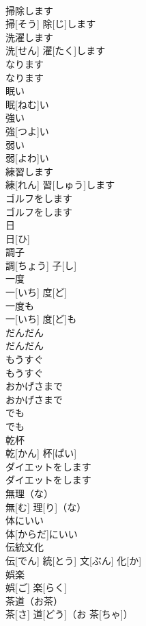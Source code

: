\documentclass[8pt]{extreport}
\begin{document}
\begin{CJK}{UTF8}{min}
\\	掃除します	
\\	掃[そう] 除[じ]します		
\\	洗濯します	
\\	洗[せん] 濯[たく]します		
\\	なります	
\\	なります		
\\	眠い	
\\	眠[ねむ]い		
\\	強い	
\\	強[つよ]い		
\\	弱い	
\\	弱[よわ]い		
\\	練習します	
\\	練[れん] 習[しゅう]します		
\\	ゴルフをします	
\\	ゴルフをします		
\\	日	
\\	日[ひ]		
\\	調子	
\\	調[ちょう] 子[し]		
\\	一度	
\\	一[いち] 度[ど]		
\\	一度も	
\\	一[いち] 度[ど]も		
\\	だんだん	
\\	だんだん		
\\	もうすぐ	
\\	もうすぐ		
\\	おかげさまで	
\\	おかげさまで		
\\	でも	
\\	でも		
\\	乾杯	
\\	乾[かん] 杯[ぱい]		
\\	ダイエットをします	
\\	ダイエットをします		
\\	無理（な）	
\\	無[む] 理[り]（な）		
\\	体にいい	
\\	体[からだ]にいい		
\\	伝統文化	
\\	伝[でん] 統[とう] 文[ぶん] 化[か]		
\\	娯楽	
\\	娯[ご] 楽[らく]		
\\	茶道（お茶）	
\\	茶[さ] 道[どう]（お 茶[ちゃ]）		

\end{CJK}
\end{document}
